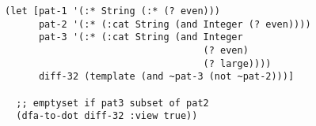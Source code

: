 \begin{lstlisting}[style=reclojureClojure]
(let [pat-1 '(:* String (:* (? even)))
      pat-2 '(:* (:cat String (and Integer (? even))))
      pat-3 '(:* (:cat String (and Integer
                                   (? even) 
                                   (? large))))
      diff-32 (template (and ~pat-3 (not ~pat-2)))]

  ;; emptyset if pat3 subset of pat2
  (dfa-to-dot diff-32 :view true))
\end{lstlisting}
